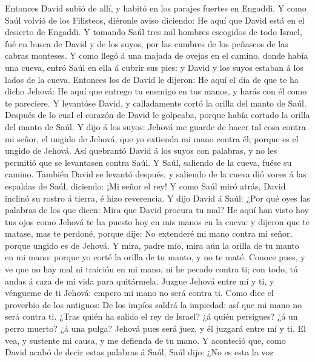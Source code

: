  Entonces David subió de allí, y habitó en los parajes
fuertes en Engaddi.  Y como Saúl volvió de los Filisteos,
diéronle aviso diciendo: He aquí que David está en el desierto de
Engaddi.  Y tomando Saúl tres mil hombres escogidos de todo
Israel, fué en busca de David y de los suyos, por las cumbres de los
peñascos de las cabras monteses.  Y como llegó á una majada
de ovejas en el camino, donde había una cueva, entró Saúl en ella á
cubrir sus pies: y David y los suyos estaban á los lados de la cueva.
 Entonces los de David le dijeron: He aquí el día de que te
ha dicho Jehová: He aquí que entrego tu enemigo en tus manos, y harás
con él como te pareciere. Y levantóse David, y calladamente cortó la
orilla del manto de Saúl.  Después de lo cual el corazón de
David le golpeaba, porque había cortado la orilla del manto de Saúl.
 Y dijo á los suyos: Jehová me guarde de hacer tal cosa
contra mi señor, el ungido de Jehová, que yo extienda mi mano contra él;
porque es el ungido de Jehová.  Así quebrantó David á los
suyos con palabras, y no les permitió que se levantasen contra Saúl. Y
Saúl, saliendo de la cueva, fuése su camino.  También David
se levantó después, y saliendo de la cueva dió voces á las espaldas de
Saúl, diciendo: ¡Mi señor el rey! Y como Saúl miró atrás, David inclinó
su rostro á tierra, é hizo reverencia.  Y dijo David á
Saúl: ¿Por qué oyes las palabras de los que dicen: Mira que David
procura tu mal?  He aquí han visto hoy tus ojos como Jehová
te ha puesto hoy en mis manos en la cueva: y dijeron que te matase, mas
te perdoné, porque dije: No extenderé mi mano contra mi señor, porque
ungido es de Jehová.  Y mira, padre mío, mira aún la orilla
de tu manto en mi mano: porque yo corté la orilla de tu manto, y no te
maté. Conoce pues, y ve que no hay mal ni traición en mi mano, ni he
pecado contra ti; con todo, tú andas á caza de mi vida para quitármela.
 Juzgue Jehová entre mí y ti, y véngueme de ti Jehová:
empero mi mano no será contra ti.  Como dice el proverbio
de los antiguos: De los impíos saldrá la impiedad: así que mi mano no
será contra ti.  ¿Tras quién ha salido el rey de Israel? ¿á
quién persigues? ¿á un perro muerto? ¿á una pulga?  Jehová
pues será juez, y él juzgará entre mí y ti. El vea, y sustente mi causa,
y me defienda de tu mano.  Y aconteció que, como David
acabó de decir estas palabras á Saúl, Saúl dijo: ¿No es esta la voz
